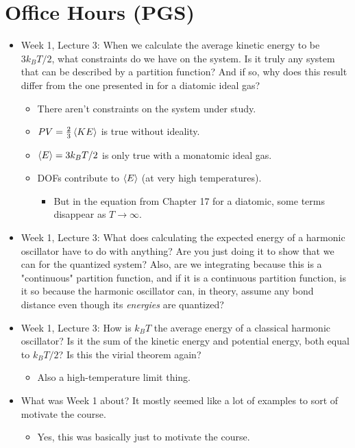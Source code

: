 \documentclass[../notes.tex]{subfiles}
\begin{document}
\section{Office Hours (PGS)}
\begin{itemize}
    \item Week 1, Lecture 3: When we calculate the average kinetic energy to be $3k_BT/2$, what constraints do we have on the system. Is it truly any system that can be described by a partition function? And if so, why does this result differ from the one presented in \textcite{bib:McQuarrieSimon} for a diatomic ideal gas?
    \begin{itemize}
        \item There aren't constraints on the system under study.
        \item $PV=\frac{2}{3}\left\langle{KE}\right\rangle$ is true without ideality.
        \item $\left\langle{E}\right\rangle=3k_BT/2$ is only true with a monatomic ideal gas.
        \item DOFs contribute to $\left\langle{E}\right\rangle$ (at very high temperatures).
        \begin{itemize}
            \item But in the equation from Chapter 17 for a diatomic, some terms disappear as $T\to\infty$.
        \end{itemize}
    \end{itemize}
    \item Week 1, Lecture 3: What does calculating the expected energy of a harmonic oscillator have to do with anything? Are you just doing it to show that we can for the quantized system? Also, are we integrating because this is a "continuous" partition function, and if it is a continuous partition function, is it so because the harmonic oscillator can, in theory, assume any bond distance even though its \emph{energies} are quantized?
    \item Week 1, Lecture 3: How is $k_BT$ the average energy of a classical harmonic oscillator? Is it the sum of the kinetic energy and potential energy, both equal to $k_BT/2$? Is this the virial theorem again?
    \begin{itemize}
        \item Also a high-temperature limit thing.
    \end{itemize}
    \item What was Week 1 about? It mostly seemed like a lot of examples to sort of motivate the course.
    \begin{itemize}
        \item Yes, this was basically just to motivate the course.

\end{itemize}
\end{itemize}
\end{document}
